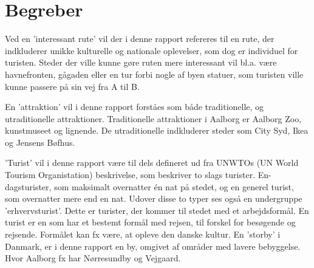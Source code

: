 \section{Begreber}
Ved en ’interessant rute’ vil der i denne rapport refereres til en rute, der indkluderer unikke kulturelle og nationale oplevelser, som dog er individuel for turisten. Steder der ville kunne gøre ruten mere interessant vil bl.a. være havnefronten, gågaden eller en tur forbi nogle af byen statuer, som turisten ville kunne passere på sin vej fra A til B.\newline

En ’attraktion’ vil i denne rapport forståes som både traditionelle, og utraditionelle attraktioner. Traditionelle attraktioner i Aalborg er Aalborg Zoo, kunstmuseet og lignende. De utraditionelle indkluderer steder som City Syd, Ikea og Jensens Bøfhus.\newline

’Turist’ vil i denne rapport være til dels defineret ud fra UNWTOs (UN World Tourism Organistation) beskrivelse, som beskriver to slags turister. En-dagsturister, som maksimalt overnatter én nat på stedet, og en generel turist, som overnatter mere end en nat\citep{Turismen}. Udover disse to typer ses også en undergruppe ’erhvervsturist’. Dette er turister, der kommer til stedet med et arbejdsformål. \newline
En turist er en som har et bestemt formål med rejsen, til forskel for besøgende og rejsende. Formålet kan fx være, at opleve den danske kultur. \newline
En ’storby’ i Danmark, er i denne rapport en by, omgivet af områder med lavere bebyggelse. Hvor Aalborg fx har Nørresundby og Vejgaard.
